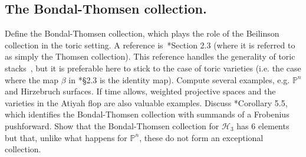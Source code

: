 \documentclass[11pt]{amsart}
\numberwithin{equation}{section}
\theoremstyle{definition}
\theoremstyle{remark}
\newcommand{\PP}{\mathbb P}
\newcommand{\QQ}{\mathbb Q}
\begin{document}
\subsection{The Bondal-Thomsen collection.}
Define the Bondal-Thomsen collection, which plays the role of the Beilinson collection in the toric setting. A reference is~\cite{HHL24}*{Section 2.3} (where it is referred to as simply the Thomsen collection). This reference handles the generality of toric stacks~\cite{GS}, but it is preferable here to stick to the case of toric varieties (i.e. the case where the map $\beta$ in \cite{HHL24}*{\S 2.3} is the identity map). Compute several examples, e.g. $\PP^n$ and Hirzebruch surfaces. If time allows, weighted projective spaces and the varieties in the Atiyah flop are also valuable examples. Discuss \cite{HHL24}*{Corollary 5.5}, which identifies the Bondal-Thomsen collection with summands of a Frobenius pushforward. 
Show that the  Bondal-Thomsen collection for $\mathcal H_3$ has $6$ elements but that, unlike what happens for $\PP^n$, these do not form an exceptional collection.


\end{document}
